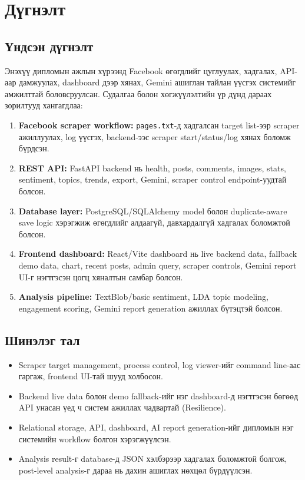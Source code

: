 \chapter{Дүгнэлт}
\label{Chapter6}

\section{Үндсэн дүгнэлт}

Энэхүү дипломын ажлын хүрээнд Facebook өгөгдлийг цуглуулах, хадгалах, API-аар дамжуулах, dashboard дээр хянах, Gemini ашиглан тайлан үүсгэх системийг амжилттай боловсруулсан. Судалгаа болон хөгжүүлэлтийн үр дүнд дараах зорилтууд хангагдлаа:

\begin{enumerate}
    \item \textbf{Facebook scraper workflow:} \texttt{pages.txt}-д хадгалсан target list-ээр scraper ажиллуулах, log үүсгэх, backend-ээс scraper start/status/log хянах боломж бүрдсэн.
    \item \textbf{REST API:} FastAPI backend нь health, posts, comments, images, stats, sentiment, topics, trends, export, Gemini, scraper control endpoint-уудтай болсон.
    \item \textbf{Database layer:} PostgreSQL/SQLAlchemy model болон duplicate-aware save logic хэрэгжиж өгөгдлийг алдаагүй, давхардалгүй хадгалах боломжтой болсон.
    \item \textbf{Frontend dashboard:} React/Vite dashboard нь live backend data, fallback demo data, chart, recent posts, admin query, scraper controls, Gemini report UI-г нэгтгэсэн цогц хяналтын самбар болсон.
    \item \textbf{Analysis pipeline:} TextBlob/basic sentiment, LDA topic modeling, engagement scoring, Gemini report generation ажиллах бүтэцтэй болсон.
\end{enumerate}

\section{Шинэлэг тал}

\begin{itemize}
    \item Scraper target management, process control, log viewer-ийг command line-аас гаргаж, frontend UI-тай шууд холбосон.
    \item Backend live data болон demo fallback-ийг нэг dashboard-д нэгтгэсэн бөгөөд API унасан үед ч систем ажиллах чадвартай (Resilience).
    \item Relational storage, API, dashboard, AI report generation-ийг дипломын нэг системийн workflow болгон хэрэгжүүлсэн.
    \item Analysis result-г database-д JSON хэлбэрээр хадгалах боломжтой болгож, post-level analysis-г дараа нь дахин ашиглах нөхцөл бүрдүүлсэн.
\end{itemize}

